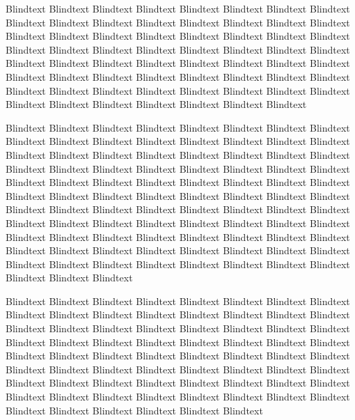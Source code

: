 
Blindtext Blindtext Blindtext Blindtext Blindtext Blindtext Blindtext
Blindtext Blindtext Blindtext Blindtext Blindtext Blindtext Blindtext
Blindtext Blindtext Blindtext Blindtext Blindtext Blindtext Blindtext
Blindtext Blindtext Blindtext Blindtext Blindtext Blindtext Blindtext
Blindtext Blindtext Blindtext Blindtext Blindtext Blindtext Blindtext
Blindtext Blindtext Blindtext Blindtext Blindtext Blindtext Blindtext
Blindtext Blindtext Blindtext Blindtext Blindtext Blindtext Blindtext
Blindtext Blindtext Blindtext Blindtext Blindtext Blindtext Blindtext
Blindtext Blindtext Blindtext Blindtext Blindtext Blindtext Blindtext

Blindtext Blindtext Blindtext Blindtext Blindtext Blindtext Blindtext
Blindtext Blindtext Blindtext Blindtext Blindtext Blindtext Blindtext
Blindtext Blindtext Blindtext Blindtext Blindtext Blindtext Blindtext
Blindtext Blindtext Blindtext Blindtext Blindtext Blindtext Blindtext
Blindtext Blindtext Blindtext Blindtext Blindtext Blindtext Blindtext
Blindtext Blindtext Blindtext Blindtext Blindtext Blindtext Blindtext
Blindtext Blindtext Blindtext Blindtext Blindtext Blindtext Blindtext
Blindtext Blindtext Blindtext Blindtext Blindtext Blindtext Blindtext
Blindtext Blindtext Blindtext Blindtext Blindtext Blindtext Blindtext
Blindtext Blindtext Blindtext Blindtext Blindtext Blindtext Blindtext
Blindtext Blindtext Blindtext Blindtext Blindtext Blindtext Blindtext
Blindtext Blindtext Blindtext Blindtext Blindtext Blindtext Blindtext
Blindtext Blindtext Blindtext Blindtext Blindtext Blindtext Blindtext

Blindtext Blindtext Blindtext Blindtext Blindtext Blindtext Blindtext
Blindtext Blindtext Blindtext Blindtext Blindtext Blindtext Blindtext
Blindtext Blindtext Blindtext Blindtext Blindtext Blindtext Blindtext
Blindtext Blindtext Blindtext Blindtext Blindtext Blindtext Blindtext
Blindtext Blindtext Blindtext Blindtext Blindtext Blindtext Blindtext
Blindtext Blindtext Blindtext Blindtext Blindtext Blindtext Blindtext
Blindtext Blindtext Blindtext Blindtext Blindtext Blindtext Blindtext
Blindtext Blindtext Blindtext Blindtext Blindtext Blindtext Blindtext
Blindtext Blindtext Blindtext Blindtext Blindtext Blindtext Blindtext
Blindtext Blindtext Blindtext Blindtext Blindtext Blindtext Blindtext

